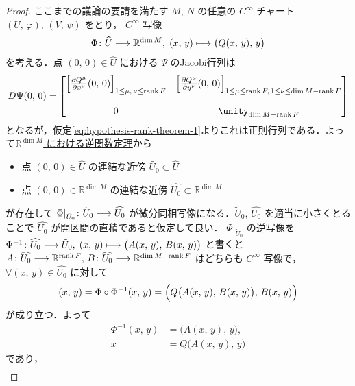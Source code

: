 \documentclass[TQFT_main]{subfiles}
\begin{document}
\begin{proof}
    ここまでの議論の要請を満たす $M,\, N$ の任意の $C^\infty$ チャート $(U,\, \varphi),\, (V,\, \psi)$ をとり， 
    $C^\infty$ 写像
    \begin{align}
        \Phi \colon \widehat{U} \longrightarrow \mathbb{R}^{\dim M},\; (x,\, y) \longmapsto \bigl( Q(x,\, y),\, y \bigr) 
    \end{align}
    を考える．点 $(0,\, 0) \in \widehat{U}$ における $\Psi$ のJacobi行列は
    \begin{align}
        D\Psi(0,\, 0) = 
        \mqty[
            \left[\pdv{Q^\mu}{x^\nu}()(0,\, 0)\right]_{1 \le \mu,\, \nu \le \rank F} & \left[\pdv{Q^\mu}{y^\nu}()(0,\, 0)\right]_{1 \le \mu \le \rank F,\, 1 \le \nu \le \dim M - \rank F} \\ 
            & \\
            0 & \unity_{\dim M - \rank F}
        ]
    \end{align}
    となるが，仮定\eqref{eq:hypothesis-rank-theorem-1}よりこれは正則行列である．よって\hyperref[thm:inverse-function-Rn]{$\mathbb{R}^{\dim M}$ における逆関数定理}から
    \begin{itemize}
        \item 点 $(0,\, 0) \in \widehat{U}$ の連結な近傍 $\tilde{U_0} \subset \widehat{U}$
        \item 点 $(0,\, 0) \in \mathbb{R}^{\dim M}$ の連結な近傍 $\widehat{U_0} \subset \mathbb{R}^{\dim M}$
    \end{itemize}
    が存在して $\Phi|_{\tilde{U}_0} \colon \tilde{U}_0 \longrightarrow \widehat{U_0}$ が微分同相写像になる．$\tilde{U}_0,\, \widehat{U_0}$ を適当に小さくとることで $\widehat{U_0}$ が開区間の直積であると仮定して良い．
    $\Phi|_{\tilde{U}_0}$ の逆写像を $\Phi^{-1} \colon \widehat{U_0} \longrightarrow \tilde{U}_0,\; (x,\, y) \longmapsto \bigl( A(x,\, y),\, B(x,\, y) \bigr)$ と書くと $A \colon \widehat{U_0} \longrightarrow \mathbb{R}^{\rank F},\, B \colon \widehat{U_0} \longrightarrow \mathbb{R}^{\dim M -\rank F}$ はどちらも $C^\infty$ 写像で，
    $\forall (x,\, y) \in \widehat{U_0}$ に対して
    \begin{align}
        (x,\, y) 
        = \Phi \circ \Phi^{-1}(x,\, y)
        = \Bigl( Q \bigl( A(x,\, y),\, B(x,\, y) \bigr),\, B(x,\, y)  \Bigr)
    \end{align}
    が成り立つ．よって
    \begin{align}
        \Phi^{-1}(x,\, y) &= \bigl( A(x,\, y),\, y \bigr) , \\
        x &= Q \bigl( A(x,\, y),\, y \bigr) 
    \end{align}
    であり，
    \begin{align}

\end{align}
\end{proof}
\end{document}
